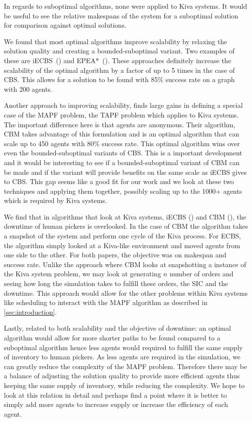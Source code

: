 \documentclass[a4paper,11pt]{article}
\begin{document}
In regards to suboptimal algorithms, none were applied to Kiva systems. It would be useful to see the relative makespans of the system for a suboptimal solution for comparison against optimal solutions.

We found that most optimal algorithms improve scalability by relaxing the solution quality and creating a bounded-suboptimal variant. Two examples of these are iECBS~(\cite{cohen2016improved}) and EPEA*~(\cite{goldenberg2014enhanced}). These approaches definitely increase the scalability of the optimal algorithm by a factor of up to 5 times in the case of CBS. This allows for a solution to be found with 85\% success rate on a graph with 200 agents.

Another approach to improving scalability, \cite{ma2016optimal} finds large gains in defining a special case of the MAPF problem, the TAPF problem which applies to Kiva systems. The important difference here is that agents are anonymous. Their algorithm, CBM takes advantage of this formulation and is an optimal algorithm that can scale up to 450 agents with 80\% success rate. This optimal algorithm wins over even the bounded-suboptimal variants of CBS. This is a important development and it would be interesting to see if a bounded-suboptimal variant of CBM can be made and if the variant will provide benefits on the same scale as iECBS gives to CBS.  This gap seems like a good fit for our work and we look at these two techniques and applying them together, possibly scaling up to the 1000+ agents which is required by Kiva systems.

We find that in algorithms that look at Kiva systems, iECBS (\cite{cohen2016improved})  and CBM (\cite{ma2016optimal}), the downtime of human pickers is overlooked. In the case of CBM the algorithm takes a snapshot of the system and perform one cycle of the Kiva process. For ECBS, the algorithm simply looked at a Kiva-like environment and moved agents from one side to the other. For both papers, the objective was on makespan and success rate. Unlike the approach where CBM looks at snapshotting a instance of the Kiva system problem, we may look at generating $n$ number of orders and seeing how long the simulation takes to fulfill these orders, the SIC and the downtime. This approach would allow for the other problems within Kiva systems like scheduling to interact with the MAPF algorithm as described in \ref{sec:introduction}.

Lastly, related to both scalability and the objective of downtime: an optimal algorithm would allow for more shorter paths to be found compared to a suboptimal algorithm hence less agents would required to fulfill the same supply of inventory to human pickers. As less agents are required in the simulation, we can greatly reduce the complexity of the MAPF problem. Therefore there may be a balance of adjusting the solution quality to provide more efficient agents thus keeping the same supply of inventory, while reducing the complexity. We hope to look at this relation in detail and perhaps find a point where it is better to simply add more agents to increase supply or increase the efficiency of each agent.



	
\end{document}

